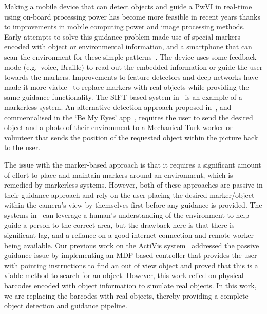 \documentclass[runningheads]{llncs}
\begin{document}
Making a mobile device that can detect objects and guide a PwVI in real-time using on-board processing power has become more feasible in recent years thanks to improvements in mobile computing power and image processing methods.
Early attempts to solve this guidance problem made use of special markers encoded with object or environmental information, and a smartphone that can scan the environment for these simple patterns~\cite{gude2013blind,iannizzotto2005badge3d,manduchi2012mobile}. 
The device uses some feedback mode (e.g.\ voice, Braille) to read out the embedded information or guide the user towards the markers. 
Improvements to feature detectors and deep networks have made it more viable~\cite{redmon2016you,huang2017speed} to replace markers with real objects while providing the same guidance functionality.
The SIFT based system in~\cite{schauerte2012assistive} is an example of a markerless system.
An alternative detection approach proposed in~\cite{bigham2010vizwiz}, and commercialised in the `Be My Eyes' app~\cite{bemyeyes2019}, requires the user to send the desired object and a photo of their environment to a Mechanical Turk worker or volunteer that sends the position of the requested object within the picture back to the user. 

The issue with the marker-based approach is that it requires a significant amount of effort to place and maintain markers around an environment, which is remedied by markerless systems.
However, both of these approaches are passive in their guidance approach and rely on the user placing the desired marker/object within the camera's view by themselves first before any guidance is provided. 
The systems in~\cite{bigham2010vizwiz,bemyeyes2019} can leverage a human's understanding of the environment to help guide a person to the correct area, but the drawback here is that there is significant lag, and a reliance on a good internet connection and remote worker being available. 
Our previous work on the ActiVis system~\cite{lock2019active} addressed the passive guidance issue by implementing an MDP-based controller that provides the user with pointing instructions to find an out of view object and proved that this is a viable method to search for an object. 
However, this work relied on physical barcodes encoded with object information to simulate real objects.
In this work, we are replacing the barcodes with real objects, thereby providing a complete object detection and guidance pipeline. 
\end{document}
